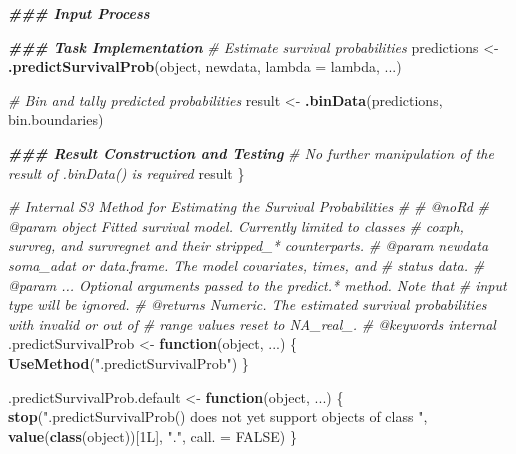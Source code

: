 \documentclass[
]{book}
\newenvironment{Shaded}{\begin{snugshade}}{\end{snugshade}}
\newcommand{\AttributeTok}[1]{\textcolor[rgb]{0.13,0.29,0.53}{#1}}
\newcommand{\CommentTok}[1]{\textcolor[rgb]{0.56,0.35,0.01}{\textit{#1}}}
\newcommand{\ConstantTok}[1]{\textcolor[rgb]{0.56,0.35,0.01}{#1}}
\newcommand{\ControlFlowTok}[1]{\textcolor[rgb]{0.13,0.29,0.53}{\textbf{#1}}}
\newcommand{\DocumentationTok}[1]{\textcolor[rgb]{0.56,0.35,0.01}{\textbf{\textit{#1}}}}
\newcommand{\FunctionTok}[1]{\textcolor[rgb]{0.13,0.29,0.53}{\textbf{#1}}}
\newcommand{\NormalTok}[1]{#1}
\newcommand{\OtherTok}[1]{\textcolor[rgb]{0.56,0.35,0.01}{#1}}
\newcommand{\StringTok}[1]{\textcolor[rgb]{0.31,0.60,0.02}{#1}}
\begin{document}
\begin{Shaded}
\begin{Highlighting}[]
  \DocumentationTok{\#\#\# Input Process}
  
  \DocumentationTok{\#\#\# Task Implementation}
  \CommentTok{\# Estimate survival probabilities}
\NormalTok{  predictions }\OtherTok{\textless{}{-}} \FunctionTok{.predictSurvivalProb}\NormalTok{(object, newdata, }\AttributeTok{lambda =}\NormalTok{ lambda, ...)}
  
  \CommentTok{\# Bin and tally predicted probabilities}
\NormalTok{  result }\OtherTok{\textless{}{-}} \FunctionTok{.binData}\NormalTok{(predictions, bin.boundaries)}
  
  \DocumentationTok{\#\#\# Result Construction and Testing}
  \CommentTok{\# No further manipulation of the result of .binData() is required}
\NormalTok{  result}
\NormalTok{\}}

\CommentTok{\#\textquotesingle{} Internal S3 Method for Estimating the Survival Probabilities}
\CommentTok{\#\textquotesingle{} }
\CommentTok{\#\textquotesingle{} @noRd}
\CommentTok{\#\textquotesingle{} @param object Fitted survival model. Currently limited to classes}
\CommentTok{\#\textquotesingle{}   \textasciigrave{}coxph\textasciigrave{}, \textasciigrave{}survreg\textasciigrave{}, and \textasciigrave{}survregnet\textasciigrave{} and their \textasciigrave{}stripped\_*\textasciigrave{} counterparts.}
\CommentTok{\#\textquotesingle{} @param newdata soma\_adat or data.frame. The model covariates, times, and}
\CommentTok{\#\textquotesingle{}   status data.}
\CommentTok{\#\textquotesingle{} @param ... Optional arguments passed to the \textasciigrave{}predict.*\textasciigrave{} method. Note that}
\CommentTok{\#\textquotesingle{}   input \textasciigrave{}type\textasciigrave{} will be ignored.}
\CommentTok{\#\textquotesingle{} @returns Numeric. The estimated survival probabilities with invalid or out of}
\CommentTok{\#\textquotesingle{}   range values reset to NA\_real\_.}
\CommentTok{\#\textquotesingle{} @keywords internal}
\NormalTok{.predictSurvivalProb }\OtherTok{\textless{}{-}} \ControlFlowTok{function}\NormalTok{(object, ...) \{ }
  \FunctionTok{UseMethod}\NormalTok{(}\StringTok{".predictSurvivalProb"}\NormalTok{) }
\NormalTok{\}}

\NormalTok{.predictSurvivalProb.default }\OtherTok{\textless{}{-}} \ControlFlowTok{function}\NormalTok{(object, ...) \{}
  \FunctionTok{stop}\NormalTok{(}\StringTok{"\textasciigrave{}.predictSurvivalProb()\textasciigrave{} does not yet support objects of class "}\NormalTok{,}
       \FunctionTok{value}\NormalTok{(}\FunctionTok{class}\NormalTok{(object))[1L], }\StringTok{"."}\NormalTok{, }\AttributeTok{call. =} \ConstantTok{FALSE}\NormalTok{)}
\NormalTok{\}}


\end{Highlighting}
\end{Shaded}
\end{document}
